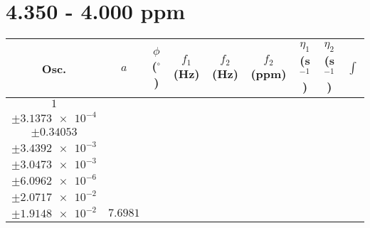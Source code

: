 \documentclass[8pt]{article}
\begin{document}
\section*{4.350 - 4.000 ppm}
\begin{longtable}[l]{c c c c c c c c c}
\toprule
Osc. & $a$ & $\phi$ ($^{\circ}$) & $f_1$ (Hz) & $f_2$ (Hz) & $f_2$ (ppm) & $\eta_1$ (s$^{-1}$) & $\eta_2$ (s$^{-1}$) & $\int$\\
\midrule
$\num{1}$ & \begin{tabular}[c]{@{}c@{}}$\num{5.3467e-2}$ \\ $\pm\num{3.1373e-4}$\end{tabular} & \begin{tabular}[c]{@{}c@{}}$\num{-0.37038}$ \\ $\pm\num{0.34053}$\end{tabular} & \begin{tabular}[c]{@{}c@{}}$\num{-9.9736}$ \\ $\pm\num{3.4392e-3}$\end{tabular} & \begin{tabular}[c]{@{}c@{}}$\num{2.0213e+3}$ \\ $\pm\num{3.0473e-3}$\end{tabular} & \begin{tabular}[c]{@{}c@{}}$\num{4.0437}$ \\ $\pm\num{6.0962e-6}$\end{tabular} & \begin{tabular}[c]{@{}c@{}}$\num{3.0353}$ \\ $\pm\num{2.0717e-2}$\end{tabular} & \begin{tabular}[c]{@{}c@{}}$\num{2.7346}$ \\ $\pm\num{1.9148e-2}$\end{tabular} & $\num{7.6981}$\\

\end{longtable}
\end{document}
